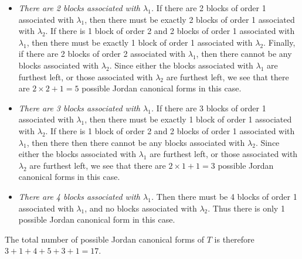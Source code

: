 \documentclass[12pt]{article}
\begin{document}
\begin{itemize}
\begin{itemize}
\item
{\it There are 2 blocks associated with $\lambda_1$.} If there are 2 blocks of order 1 associated with $\lambda_1$, then there must be exactly 2 blocks of order 1 associated with $\lambda_2$. If there is 1 block of order 2 and 2 blocks of order 1 associated with $\lambda_1$, then there must be exactly 1 block of order 1 associated with $\lambda_2$. Finally, if there are 2 blocks of order 2 associated with $\lambda_1$, then there cannot be any blocks associated with $\lambda_2$. Since either the blocks associated with $\lambda_1$ are furthest left, or those associated with $\lambda_2$ are furthest left, we see that there are $2 \times 2 + 1 = 5$ possible Jordan canonical forms in this case.

\item
{\it There are 3 blocks associated with $\lambda_1$.} If there are 3 blocks of order 1 associated with $\lambda_1$, then there must be exactly 1 block of order 1 associated with $\lambda_2$. If there is 1 block of order 2 and 2 blocks of order 1 associated with $\lambda_1$, then there then there cannot be any blocks associated with $\lambda_2$. Since either the blocks associated with $\lambda_1$ are furthest left, or those associated with $\lambda_2$ are furthest left, we see that there are $2 \times 1 + 1 = 3$ possible Jordan canonical forms in this case.

\item
{\it There are 4 blocks associated with $\lambda_1$.} Then there must be 4 blocks of order 1 associated with $\lambda_1$, and no blocks associated with $\lambda_2$. Thus there is only 1 possible Jordan canonical form in this case.

\end{itemize}

\end{itemize}

The total number of possible Jordan canonical forms of $T$ is therefore $3 + 1 + 4 + 5 + 3 + 1 = 17$.
\end{document}
